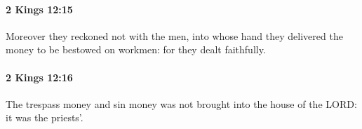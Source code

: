 		\paragraph{2 Kings 12:15} %
			\label{2KINGS-12-15}

			Moreover they reckoned not with the men, into whose hand they delivered the money to be bestowed on workmen: for they dealt faithfully.


		\paragraph{2 Kings 12:16} %
			\label{2KINGS-12-16}

			The trespass money and sin money was not brought into the house of the LORD: it was the priests’.


